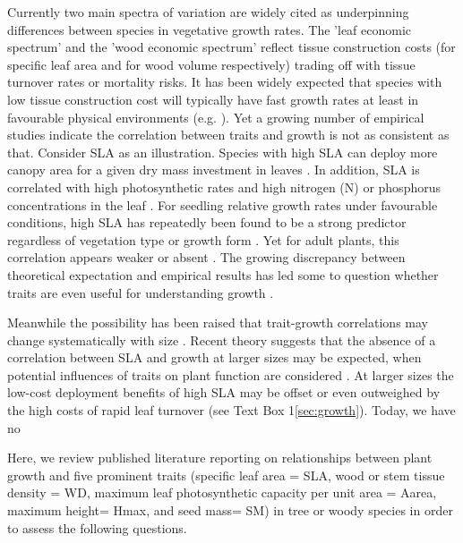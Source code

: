 \documentclass[a4paper]{article}\usepackage[]{graphicx}\usepackage[]{color}
\begin{document}
Currently two main spectra of variation are widely cited as underpinning differences between species in vegetative growth rates. The 'leaf economic spectrum' \citep{Wright:2004jb} and the 'wood economic spectrum' \citep{Chave:2009iy} reflect tissue construction costs (for specific leaf area and for wood volume respectively) trading off with tissue turnover rates or mortality risks. It has been widely expected that species with low tissue construction cost will typically have fast growth rates at least in favourable physical environments (e.g. \citealt{MullerLandau:2004dc,Wright:2004jb,Poorter:2008iu,Chave:2009iy,Larjavaara:2010bn,Iida:2012jb,Paine:2015df}). Yet a growing number of empirical studies indicate the correlation between traits and growth is not as consistent as that. Consider SLA as an illustration. Species with high SLA can deploy more canopy area for a given dry mass investment in leaves \citep{Poorter:1999wd, Reich:1992wm}. In addition, SLA is correlated with high photosynthetic rates and high nitrogen (N) or phosphorus concentrations in the leaf \citep{Wright:2004jb}. For seedling relative growth rates under favourable conditions, high SLA has repeatedly been found to be a strong predictor regardless of vegetation type or growth form \citep{Lambers:1992bj,Reich:1992wm,Grime:1997wm,Poorter:1999wd,Wright:1999ds}. Yet for adult plants, this correlation appears weaker or absent \citep{coomes_comparison_1998,Poorter:2008iu,Aiba:2009ft,Easdale:2009gv,Wright:2010tp}. The growing discrepancy between theoretical expectation and empirical results has led some to question whether traits are even useful for understanding growth \citep{Wright:2010tp, Paine:2015df}.

Meanwhile the possibility has been raised that trait-growth correlations may change systematically with size \citep{Enquist:2007ek,Falster:2011ii, Ruger:2012jv, Iida:2014ep, Iida:2014hq}. Recent theory suggests that the absence of a correlation between SLA and growth at larger sizes may be expected, when potential influences of traits on plant function are considered \citep{Falster:2011ii, falster:2013}. At larger sizes the low-cost deployment benefits of high SLA may be offset or even outweighed by the high costs of rapid leaf turnover (see Text Box 1\ref{sec:growth}). Today, we have no 

Here, we review published literature reporting on relationships between plant growth and five prominent traits (specific leaf area = SLA, wood or stem tissue density = WD, maximum leaf photosynthetic capacity per unit area = Aarea,  maximum height= Hmax, and seed mass= SM) in tree or woody species in order to assess the following questions. 
\end{document}

